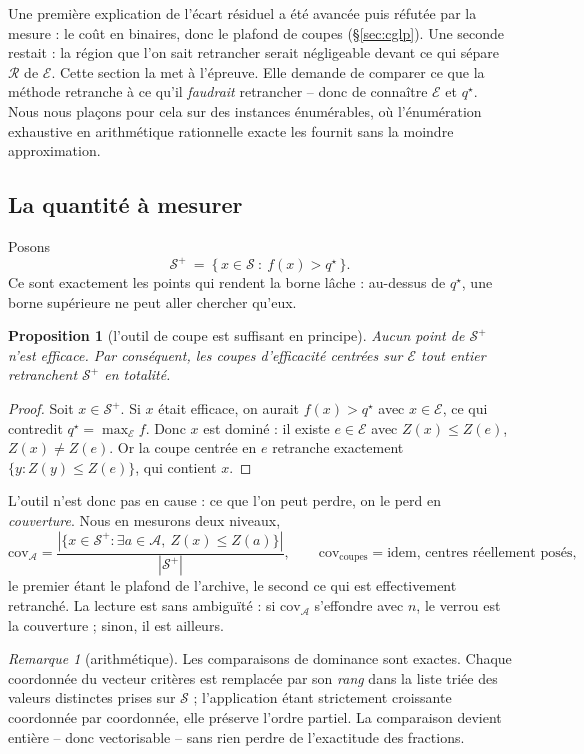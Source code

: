 \documentclass[11pt,a4paper]{article}
\theoremstyle{plain}
\newtheorem{proposition}[theorem]{Proposition}
\theoremstyle{remark}
\newtheorem{remark}{Remarque}
\newcommand{\Ecal}{\mathcal{E}}
\newcommand{\Scal}{\mathcal{S}}
\newcommand{\Rcal}{\mathcal{R}}
\newcommand{\Acal}{\mathcal{A}}
\newcommand{\qs}{q^{\star}}
\begin{document}
Une première explication de l'écart résiduel a été avancée puis réfutée par
la mesure : le coût en binaires, donc le plafond de coupes
(§\ref{sec:cglp}). Une seconde restait : la région que l'on sait retrancher
serait négligeable devant ce qui sépare $\Rcal$ de $\Ecal$.
Cette section la met à l'épreuve. Elle demande de comparer ce que la méthode
retranche à ce qu'il \emph{faudrait} retrancher -- donc de connaître $\Ecal$
et $\qs$. Nous nous plaçons pour cela sur des instances énumérables, où
l'énumération exhaustive en arithmétique rationnelle exacte les fournit sans
la moindre approximation.

\subsection{La quantité à mesurer}

Posons
\[
  \Scal^{+}\ =\ \{\,x\in\Scal\ :\ f(x)>\qs\,\}.
\]
Ce sont exactement les points qui rendent la borne lâche : au-dessus de
$\qs$, une borne supérieure ne peut aller chercher qu'eux.

\begin{proposition}[l'outil de coupe est suffisant en principe]
\label{prop:suffisant}
Aucun point de $\Scal^{+}$ n'est efficace. Par conséquent, les coupes
d'efficacité centrées sur $\Ecal$ tout entier retranchent $\Scal^{+}$
en totalité.
\end{proposition}

\begin{proof}
Soit $x\in\Scal^{+}$. Si $x$ était efficace, on aurait $f(x)>\qs$ avec
$x\in\Ecal$, ce qui contredit $\qs=\max_{\Ecal}f$. Donc $x$ est dominé :
il existe $e\in\Ecal$ avec $Z(x)\le Z(e)$, $Z(x)\ne Z(e)$. Or la coupe
centrée en $e$ retranche exactement $\{y:Z(y)\le Z(e)\}$, qui contient $x$.
\end{proof}

L'outil n'est donc pas en cause : ce que l'on peut perdre, on le perd en
\emph{couverture}. Nous en mesurons deux niveaux,
\[
  \text{cov}_{\Acal}=\frac{|\{x\in\Scal^{+}:\exists a\in\Acal,\ Z(x)\le Z(a)\}|}
                         {|\Scal^{+}|},
  \qquad
  \text{cov}_{\text{coupes}}=\text{idem, centres réellement posés},
\]
le premier étant le plafond de l'archive, le second ce qui est effectivement
retranché. La lecture est sans ambiguïté : si $\text{cov}_{\Acal}$ s'effondre
avec $n$, le verrou est la couverture ; sinon, il est ailleurs.

\begin{remark}[arithmétique]
Les comparaisons de dominance sont exactes. Chaque coordonnée du vecteur
critères est remplacée par son \emph{rang} dans la liste triée des valeurs
distinctes prises sur $\Scal$ ; l'application étant strictement croissante
coordonnée par coordonnée, elle préserve l'ordre partiel. La comparaison
devient entière -- donc vectorisable -- sans rien perdre de l'exactitude des
fractions.
\end{remark}
\end{document}
